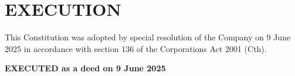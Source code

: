 \documentclass[12pt,a4paper]{article}
\begin{document}


















\newpage
\section*{EXECUTION}

This Constitution was adopted by special resolution of the Company on 9 June 2025 in accordance with section 136 of the Corporations Act 2001 (Cth).

\vspace{2cm}

\textbf{EXECUTED as a deed on 9 June 2025}

\vspace{3cm}
\end{document}
